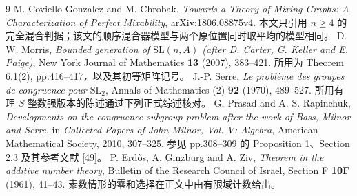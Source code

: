 \documentclass[11pt,a4paper]{article}
\theoremstyle{definition}
\numberwithin{equation}{section}
\begin{document}
\begin{thebibliography}{9}
M. Coviello Gonzalez and M. Chrobak,
\emph{Towards a Theory of Mixing Graphs: A Characterization of Perfect Mixability},
arXiv:1806.08875v4.
本文只引用 $n\ge4$ 的完全混合判据；该文的顺序混合器模型与两个原位置同时取平均的模型相同。
D. W. Morris,
\emph{Bounded generation of $\mathrm{SL}(n,A)$ (after D. Carter, G. Keller and E. Paige)},
New York Journal of Mathematics \textbf{13} (2007), 383--421.
所用为 Theorem 6.1(2), pp.416--417，以及其初等矩阵记号。
J.-P. Serre,
\emph{Le probl\`eme des groupes de congruence pour $\mathrm{SL}_2$},
Annals of Mathematics (2) \textbf{92} (1970), 489--527.
所用有理 $S$ 整数强版本的陈述通过下列正式综述核对。
G. Prasad and A. S. Rapinchuk,
\emph{Developments on the congruence subgroup problem after the work of Bass, Milnor and Serre},
in \emph{Collected Papers of John Milnor, Vol. V: Algebra},
American Mathematical Society, 2010, 307--325.
参见 pp.308--309 的 Proposition 1、Section 2.3 及其参考文献 [49]。
P. Erd\H{o}s, A. Ginzburg and A. Ziv,
\emph{Theorem in the additive number theory},
Bulletin of the Research Council of Israel, Section F \textbf{10F} (1961), 41--43.
素数情形的零和选择在正文中由有限域计数给出。
\end{thebibliography}
\end{document}
